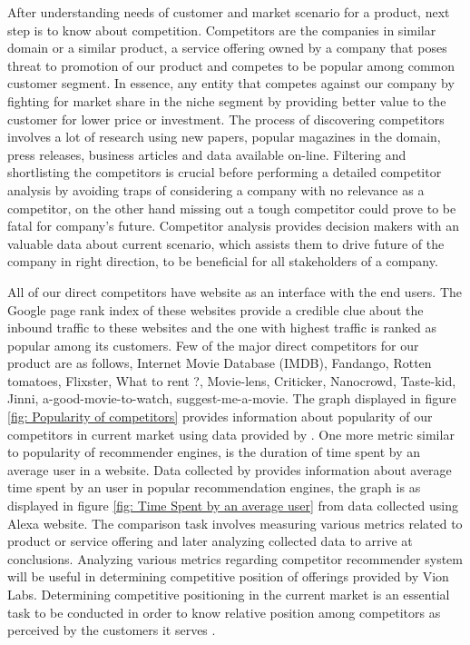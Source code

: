  After understanding needs of customer and market scenario for a product, next step is to know about competition. Competitors are the companies in similar domain or a similar product, a service offering owned by a company that poses threat to promotion of our product and competes to be popular among common customer segment. In essence, any entity that competes against our company by fighting for market share in the niche segment by providing better value to the customer for lower price or investment. The process of discovering competitors involves a lot of research using new papers, popular magazines in the domain, press releases, business articles and data available on-line. Filtering and shortlisting the competitors is crucial before performing a detailed competitor analysis by avoiding traps of considering a company with no relevance as a competitor, on the other hand missing out a tough competitor could prove to be fatal for company's future. Competitor analysis provides decision makers with an valuable data about current scenario, which assists them to drive future of the company in right direction, to be beneficial for all stakeholders of a company. 
 
 All of our direct competitors have website as an interface with the end users. The Google page rank index of these websites provide a credible clue about the inbound traffic to these websites and the one with highest traffic is ranked as popular among its customers. Few of the major direct competitors for our product are as follows, Internet Movie Database (\acrshort{IMDB}), Fandango, Rotten tomatoes, Flixster, What to rent ?, Movie-lens, Criticker, Nanocrowd, Taste-kid, Jinni, a-good-movie-to-watch, suggest-me-a-movie. The graph displayed in figure \ref{fig: Popularity of competitors} provides information about popularity of our competitors in current market using data provided by \citep{popularity_online}. One more metric similar to popularity of recommender engines, is the duration of time spent by an average user in a website. Data collected by  provides information about average time spent by an user in popular recommendation engines, the graph is as displayed in figure \ref{fig: Time Spent by an average user} from data collected using Alexa \citep{Alexa_imdb} website. The comparison task involves measuring various metrics related to product or service offering and later analyzing collected data to arrive at conclusions. Analyzing various metrics regarding competitor recommender system will be useful in determining competitive position of offerings provided by Vion Labs. Determining competitive positioning in the current market is an essential task to be conducted in order to know relative position among competitors as perceived by the customers it serves \citep{Fleisher_411:2007:BCA:1408337}.  

